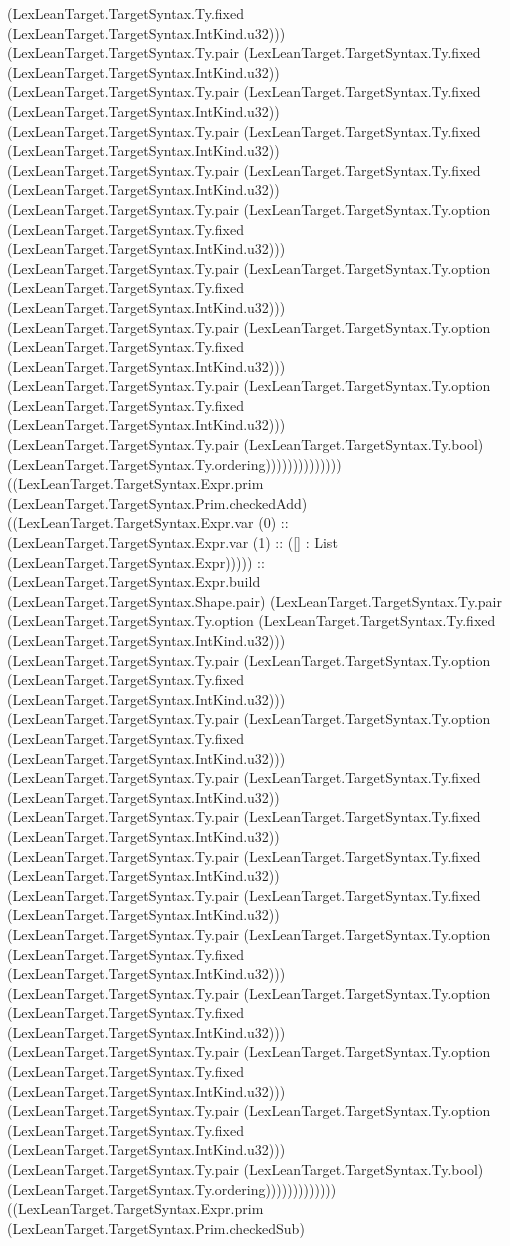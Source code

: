\documentclass[11pt]{article}
\begin{document}
(LexLeanTarget.TargetSyntax.Ty.fixed (LexLeanTarget.TargetSyntax.IntKind.u32))) (LexLeanTarget.TargetSyntax.Ty.pair (LexLeanTarget.TargetSyntax.Ty.fixed (LexLeanTarget.TargetSyntax.IntKind.u32)) (LexLeanTarget.TargetSyntax.Ty.pair (LexLeanTarget.TargetSyntax.Ty.fixed (LexLeanTarget.TargetSyntax.IntKind.u32)) (LexLeanTarget.TargetSyntax.Ty.pair (LexLeanTarget.TargetSyntax.Ty.fixed (LexLeanTarget.TargetSyntax.IntKind.u32)) (LexLeanTarget.TargetSyntax.Ty.pair (LexLeanTarget.TargetSyntax.Ty.fixed (LexLeanTarget.TargetSyntax.IntKind.u32)) (LexLeanTarget.TargetSyntax.Ty.pair (LexLeanTarget.TargetSyntax.Ty.option (LexLeanTarget.TargetSyntax.Ty.fixed (LexLeanTarget.TargetSyntax.IntKind.u32))) (LexLeanTarget.TargetSyntax.Ty.pair (LexLeanTarget.TargetSyntax.Ty.option (LexLeanTarget.TargetSyntax.Ty.fixed (LexLeanTarget.TargetSyntax.IntKind.u32))) (LexLeanTarget.TargetSyntax.Ty.pair (LexLeanTarget.TargetSyntax.Ty.option (LexLeanTarget.TargetSyntax.Ty.fixed (LexLeanTarget.TargetSyntax.IntKind.u32))) (LexLeanTarget.TargetSyntax.Ty.pair (LexLeanTarget.TargetSyntax.Ty.option (LexLeanTarget.TargetSyntax.Ty.fixed (LexLeanTarget.TargetSyntax.IntKind.u32))) (LexLeanTarget.TargetSyntax.Ty.pair (LexLeanTarget.TargetSyntax.Ty.bool) (LexLeanTarget.TargetSyntax.Ty.ordering)))))))))))))) ((LexLeanTarget.TargetSyntax.Expr.prim (LexLeanTarget.TargetSyntax.Prim.checkedAdd) ((LexLeanTarget.TargetSyntax.Expr.var (0) :: (LexLeanTarget.TargetSyntax.Expr.var (1) :: ([] : List (LexLeanTarget.TargetSyntax.Expr))))) :: (LexLeanTarget.TargetSyntax.Expr.build (LexLeanTarget.TargetSyntax.Shape.pair) (LexLeanTarget.TargetSyntax.Ty.pair (LexLeanTarget.TargetSyntax.Ty.option (LexLeanTarget.TargetSyntax.Ty.fixed (LexLeanTarget.TargetSyntax.IntKind.u32))) (LexLeanTarget.TargetSyntax.Ty.pair (LexLeanTarget.TargetSyntax.Ty.option (LexLeanTarget.TargetSyntax.Ty.fixed (LexLeanTarget.TargetSyntax.IntKind.u32))) (LexLeanTarget.TargetSyntax.Ty.pair (LexLeanTarget.TargetSyntax.Ty.option (LexLeanTarget.TargetSyntax.Ty.fixed (LexLeanTarget.TargetSyntax.IntKind.u32))) (LexLeanTarget.TargetSyntax.Ty.pair (LexLeanTarget.TargetSyntax.Ty.fixed (LexLeanTarget.TargetSyntax.IntKind.u32)) (LexLeanTarget.TargetSyntax.Ty.pair (LexLeanTarget.TargetSyntax.Ty.fixed (LexLeanTarget.TargetSyntax.IntKind.u32)) (LexLeanTarget.TargetSyntax.Ty.pair (LexLeanTarget.TargetSyntax.Ty.fixed (LexLeanTarget.TargetSyntax.IntKind.u32)) (LexLeanTarget.TargetSyntax.Ty.pair (LexLeanTarget.TargetSyntax.Ty.fixed (LexLeanTarget.TargetSyntax.IntKind.u32)) (LexLeanTarget.TargetSyntax.Ty.pair (LexLeanTarget.TargetSyntax.Ty.option (LexLeanTarget.TargetSyntax.Ty.fixed (LexLeanTarget.TargetSyntax.IntKind.u32))) (LexLeanTarget.TargetSyntax.Ty.pair (LexLeanTarget.TargetSyntax.Ty.option (LexLeanTarget.TargetSyntax.Ty.fixed (LexLeanTarget.TargetSyntax.IntKind.u32))) (LexLeanTarget.TargetSyntax.Ty.pair (LexLeanTarget.TargetSyntax.Ty.option (LexLeanTarget.TargetSyntax.Ty.fixed (LexLeanTarget.TargetSyntax.IntKind.u32))) (LexLeanTarget.TargetSyntax.Ty.pair (LexLeanTarget.TargetSyntax.Ty.option (LexLeanTarget.TargetSyntax.Ty.fixed (LexLeanTarget.TargetSyntax.IntKind.u32))) (LexLeanTarget.TargetSyntax.Ty.pair (LexLeanTarget.TargetSyntax.Ty.bool) (LexLeanTarget.TargetSyntax.Ty.ordering))))))))))))) ((LexLeanTarget.TargetSyntax.Expr.prim (LexLeanTarget.TargetSyntax.Prim.checkedSub) 
\end{document}
